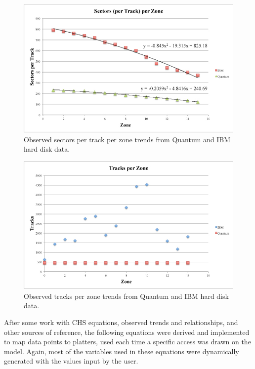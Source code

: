 \documentclass[12pt]{ucthesis}
\begin{document}
\begin{figure}[h!]
 \centering
 \includegraphics[width=\textwidth]{images/hard_disk_trends.jpg}
 \caption[Observed sectors per track per zone trends from hard disk data.]{Observed sectors per track per zone trends from Quantum and IBM hard disk data.}
 \label{fig:hard_disk_trends}
\end{figure}

\begin{figure}[h!]
 \centering
 \includegraphics[width=\textwidth]{images/hard_disk_trends2.jpg}
 \caption[Observed tracks per zone trends from hard disk data.]{Observed tracks per zone trends from Quantum and IBM hard disk data.}
 \label{fig:hard_disk_trends2}
\end{figure}

\clearpage

After some work with CHS equations, observed trends and relationships, and other sources of reference, the following equations were derived and implemented to map data points to platters, used each time a specific access was drawn on the model. Again, most of the variables used in these equations were dynamically generated with the values input by the user.
\end{document}
